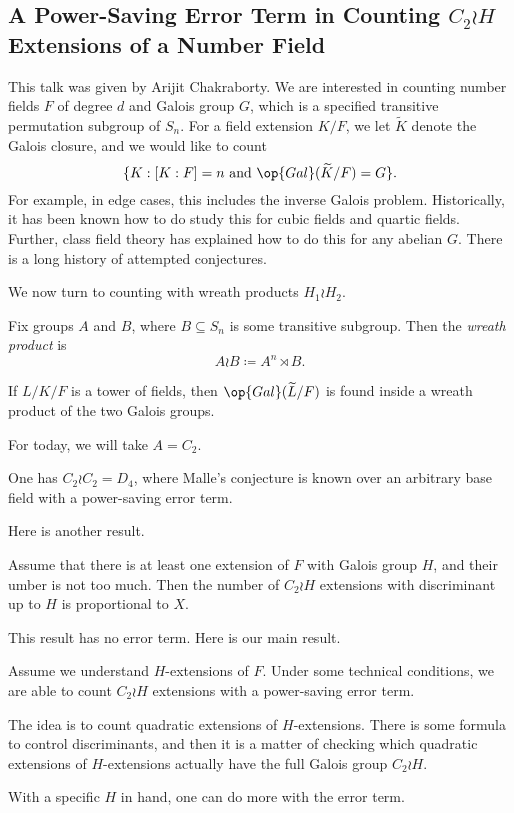 \documentclass{article}
\begin{document}
\subsection{A Power-Saving Error Term in Counting \texorpdfstring{$C_2\wr H$}{ C2 wr H} Extensions of a Number Field}
This talk was given by Arijit Chakraborty. We are interested in counting number fields $F$ of degree $d$ and Galois group $G$, which is a specified transitive permutation subgroup of $S_n$. For a field extension $K/F$, we let $\widetilde K$ denote the Galois closure, and we would like to count
\[\{K:[K:F]=n\text{ and }\op{Gal}(\widetilde K/F)=G\}.\]
For example, in edge cases, this includes the inverse Galois problem. Historically, it has been known how to do study this for cubic fields and quartic fields. Further, class field theory has explained how to do this for any abelian $G$. There is a long history of attempted conjectures.

We now turn to counting with wreath products $H_1\wr H_2$.
\begin{definition}
	Fix groups $A$ and $B$, where $B\subseteq S_n$ is some transitive subgroup. Then the \textit{wreath product} is
	\[A\wr B\coloneqq A^n\rtimes B.\]
\end{definition}
\begin{remark}
	If $L/K/F$ is a tower of fields, then $\op{Gal}(\widetilde L/F)$ is found inside a wreath product of the two Galois groups.
\end{remark}
For today, we will take $A=C_2$.
\begin{example}
	One has $C_2\wr C_2=D_4$, where Malle's conjecture is known over an arbitrary base field with a power-saving error term.
\end{example}
Here is another result.
\begin{theorem}[Kl\"unners]
	Assume that there is at least one extension of $F$ with Galois group $H$, and their umber is not too much. Then the number of $C_2\wr H$ extensions with discriminant up to $H$ is proportional to $X$.
\end{theorem}
This result has no error term. Here is our main result.
\begin{theorem}
	Assume we understand $H$-extensions of $F$. Under some technical conditions, we are able to count $C_2\wr H$ extensions with a power-saving error term.
\end{theorem}
The idea is to count quadratic extensions of $H$-extensions. There is some formula to control discriminants, and then it is a matter of checking which quadratic extensions of $H$-extensions actually have the full Galois group $C_2\wr H$.
\begin{remark}
	With a specific $H$ in hand, one can do more with the error term.
\end{remark}
\end{document}
